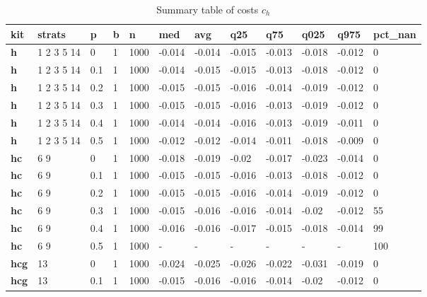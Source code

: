 \begin{longtable}[h]{|p{0.8cm}|p{1.5cm}|p{1cm}|p{1cm}|p{1cm}|p{1cm}|p{1cm}|p{1cm}|p{1cm}|p{1cm}|p{1cm}|p{1.5cm}|}
\caption{Summary table of costs $c_h$}
\label{tab:costs_mod_h} \\
      \hline
\textbf{ kit} & \textbf{ strats} & \textbf{ p} & \textbf{ b} & \textbf{ n} & \textbf{ med} & \textbf{ avg} & \textbf{ q25} & \textbf{ q75} & \textbf{ q025} & \textbf{ q975} & \textbf{ pct\_nan}
    \\ \hline
  \textbf{h   } &  1 2 3 5 14 &   0 & 1 & 1000 & -0.014 & -0.014 & -0.015 & -0.013 & -0.018 & -0.012 &   0
    \\ \hline
  \textbf{h   } &  1 2 3 5 14 & 0.1 & 1 & 1000 & -0.014 & -0.015 & -0.015 & -0.013 & -0.018 & -0.012 &   0
    \\ \hline
  \textbf{h   } &  1 2 3 5 14 & 0.2 & 1 & 1000 & -0.015 & -0.015 & -0.016 & -0.014 & -0.019 & -0.012 &   0
    \\ \hline
  \textbf{h   } &  1 2 3 5 14 & 0.3 & 1 & 1000 & -0.015 & -0.015 & -0.016 & -0.013 & -0.019 & -0.012 &   0
    \\ \hline
  \textbf{h   } &  1 2 3 5 14 & 0.4 & 1 & 1000 & -0.014 & -0.014 & -0.016 & -0.013 & -0.019 & -0.011 &   0
    \\ \hline
  \textbf{h   } &  1 2 3 5 14 & 0.5 & 1 & 1000 & -0.012 & -0.012 & -0.014 & -0.011 & -0.018 & -0.009 &   0
    \\ \hline
  \textbf{hc  } &  6 9        &   0 & 1 & 1000 & -0.018 & -0.019 &  -0.02 & -0.017 & -0.023 & -0.014 &   0
    \\ \hline
  \textbf{hc  } &  6 9        & 0.1 & 1 & 1000 & -0.015 & -0.015 & -0.016 & -0.013 & -0.018 & -0.012 &   0
    \\ \hline
  \textbf{hc  } &  6 9        & 0.2 & 1 & 1000 & -0.015 & -0.015 & -0.016 & -0.014 & -0.019 & -0.012 &   0
    \\ \hline
  \textbf{hc  } &  6 9        & 0.3 & 1 & 1000 & -0.015 & -0.016 & -0.016 & -0.014 &  -0.02 & -0.012 &  55
    \\ \hline
  \textbf{hc  } &  6 9        & 0.4 & 1 & 1000 & -0.016 & -0.016 & -0.017 & -0.015 & -0.018 & -0.014 &  99
    \\ \hline
  \textbf{hc  } &  6 9        & 0.5 & 1 & 1000 & - & - & - & - & - & - & 100
    \\ \hline
  \textbf{hcg } &  13         &   0 & 1 & 1000 & -0.024 & -0.025 & -0.026 & -0.022 & -0.031 & -0.019 &   0
    \\ \hline
  \textbf{hcg } &  13         & 0.1 & 1 & 1000 & -0.015 & -0.016 & -0.016 & -0.014 &  -0.02 & -0.012 &   0

\end{longtable}
